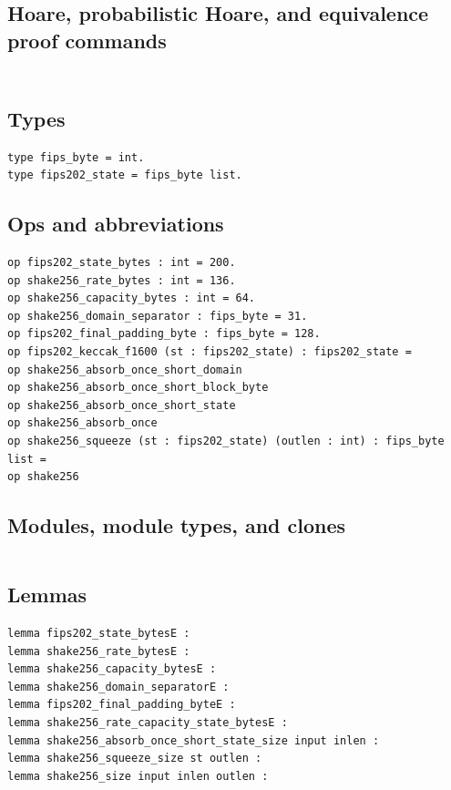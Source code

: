 \subsection*{Hoare, probabilistic Hoare, and equivalence proof commands}
\begin{lstlisting}[language=EasyCrypt,basicstyle=\ttfamily\tiny]
\end{lstlisting}

\section*{}

\subsection*{Types}
\begin{lstlisting}[language=EasyCrypt,basicstyle=\ttfamily\tiny]
type fips_byte = int.
type fips202_state = fips_byte list.
\end{lstlisting}

\subsection*{Ops and abbreviations}
\begin{lstlisting}[language=EasyCrypt,basicstyle=\ttfamily\tiny]
op fips202_state_bytes : int = 200.
op shake256_rate_bytes : int = 136.
op shake256_capacity_bytes : int = 64.
op shake256_domain_separator : fips_byte = 31.
op fips202_final_padding_byte : fips_byte = 128.
op fips202_keccak_f1600 (st : fips202_state) : fips202_state =
op shake256_absorb_once_short_domain
op shake256_absorb_once_short_block_byte
op shake256_absorb_once_short_state
op shake256_absorb_once
op shake256_squeeze (st : fips202_state) (outlen : int) : fips_byte list =
op shake256
\end{lstlisting}

\subsection*{Modules, module types, and clones}
\begin{lstlisting}[language=EasyCrypt,basicstyle=\ttfamily\tiny]
\end{lstlisting}

\subsection*{Lemmas}
\begin{lstlisting}[language=EasyCrypt,basicstyle=\ttfamily\tiny]
lemma fips202_state_bytesE :
lemma shake256_rate_bytesE :
lemma shake256_capacity_bytesE :
lemma shake256_domain_separatorE :
lemma fips202_final_padding_byteE :
lemma shake256_rate_capacity_state_bytesE :
lemma shake256_absorb_once_short_state_size input inlen :
lemma shake256_squeeze_size st outlen :
lemma shake256_size input inlen outlen :
\end{lstlisting}

